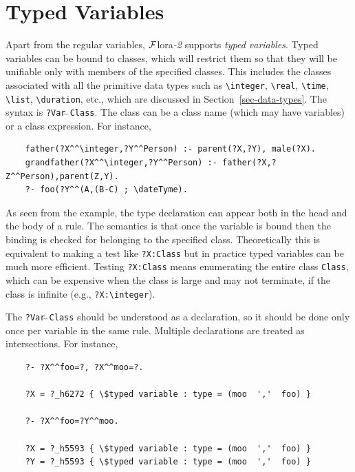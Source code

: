 \documentclass[11pt]{article}
\newcommand{\FLORA}{{\mbox{\sc ${\cal F}${lora}\rm\emph{-2}}}\xspace}
\newcommand{\FLSYSTEM}{\FLORA}
\newcommand{\bs}{\textbackslash}
\begin{document}
\section{Typed Variables} \label{sec-typedvars}

Apart from the regular variables, \FLSYSTEM supports \emph{typed variables}.
Typed variables can be bound to classes, which will restrict them so that
they will be unifiable only with members of the specified classes. This
includes the classes associated with all the primitive data types such as 
\texttt{\bs{}integer}, \texttt{\bs{}real}, \texttt{\bs{}time},
\texttt{\bs{}list}, \texttt{\bs{}duration}, etc., which are discussed in
Section~\ref{sec-data-types}. 
The syntax is \texttt{?Var$\hat{~}\hat{~}$Class}. The class can be a class
name (which may have variables) or a class expression. For instance,
\begin{verbatim}
    father(?X^^\integer,?Y^^Person) :- parent(?X,?Y), male(?X).
    grandfather(?X^^\integer,?Y^^Person) :- father(?X,?Z^^Person),parent(Z,Y).
    ?- foo(?Y^^(A,(B-C) ; \dateTyme).
\end{verbatim}
As seen from the example, the type declaration can appear both in the head
and the body of a rule. The semantics is that once the variable is bound 
then the binding is checked for belonging to the specified
class. Theoretically this is equivalent to making a test like
\texttt{?X:Class} but in practice typed variables can be much more efficient.
Testing \texttt{?X:Class} means enumerating the entire class
\texttt{Class}, which can be expensive when the class is large and may not
terminate, if the class is infinite (e.g., \texttt{?X:\bs{}integer}). 

The \texttt{?Var$\hat{~}\hat{~}$Class} should be understood as a declaration,
so it should be done only once per variable in the same rule.
Multiple declarations are treated as intersections. For instance,
\begin{verbatim}
    ?- ?X^^foo=?, ?X^^moo=?.

    ?X = ?_h6272 { \$typed variable : type = (moo  ','  foo) } 

    ?- ?X^^foo=?Y^^moo.

    ?X = ?_h5593 { \$typed variable : type = (moo  ','  foo) } 
    ?Y = ?_h5593 { \$typed variable : type = (moo  ','  foo) } 
\end{verbatim}
\end{document}
